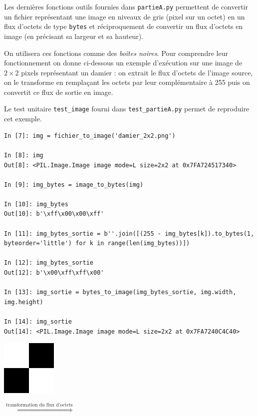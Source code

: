 \documentclass[a4paper, french, 12pt]{article}  %
\begin{document}
{\itshape

Les dernières fonctions outils fournies dans \texttt{partieA.py} permettent de convertir un fichier représentant une image en niveaux de gris (pixel sur un octet) en un flux d'octets de type \texttt{bytes} et réciproquement de convertir un flux d'octets en image (en précisant sa largeur et sa hauteur).

On utilisera ces fonctions comme des \textit{boîtes noires}. Pour comprendre leur fonctionnement on donne ci-dessous un exemple d'exécution sur une image de $2 \times 2$ pixels représentant un damier : on extrait le flux d'octets de l'image source, on le transforme en remplaçant les octets par leur complémentaire à 255 puis on convertit ce flux de sortie en image.

Le test unitaire \texttt{test\_image} fourni dans \texttt{test\_partieA.py} permet de reproduire cet exemple.

\begin{lstlisting}[style=compil]
In [7]: img = fichier_to_image('damier_2x2.png')

In [8]: img
Out[8]: <PIL.Image.Image image mode=L size=2x2 at 0x7FA724517340>

In [9]: img_bytes = image_to_bytes(img)

In [10]: img_bytes
Out[10]: b'\xff\x00\x00\xff'

In [11]: img_bytes_sortie = b''.join([(255 - img_bytes[k]).to_bytes(1, byteorder='little') for k in range(len(img_bytes))])

In [12]: img_bytes_sortie
Out[12]: b'\x00\xff\xff\x00'

In [13]: img_sortie = bytes_to_image(img_bytes_sortie, img.width, img.height)

In [14]: img_sortie
Out[14]: <PIL.Image.Image image mode=L size=2x2 at 0x7FA7240C4C40>
\end{lstlisting}

\begin{minipage}{0.35\linewidth}



\begin{center}

\includegraphics[scale=1]{images/exemple_binaire_2x2.png}
\end{center}
\end{minipage}\hfill
\begin{minipage}{0.2\linewidth}
\begin{center}
$\overset{\text{transformation du flux d'octets}}{\Rightarrow}$
\end{center}
\end{minipage}
\hfill
\begin{minipage}{0.35\linewidth}
\begin{center}


\end{center}
\end{minipage}}
\end{document}
